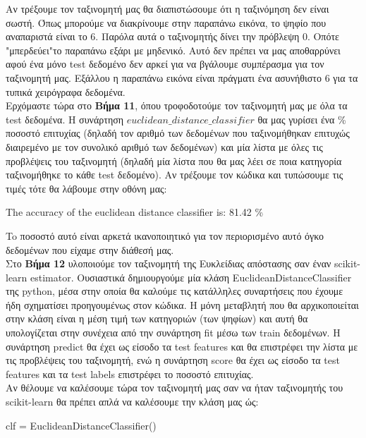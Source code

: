 \documentclass[11pt]{article} %
\begin{document}
Αν τρέξουμε τον ταξινομητή μας θα διαπιστώσουμε ότι η ταξινόμηση δεν είναι σωστή. Όπως μπορούμε να διακρίνουμε στην παραπάνω εικόνα, το ψηφίο που αναπαριστά είναι το $6$. Παρόλα αυτά ο ταξινομητής δίνει την πρόβλεψη $0$. Οπότε "μπερδεύει"το παραπάνω εξάρι με μηδενικό. Αυτό δεν πρέπει να μας αποθαρρύνει αφού ένα μόνο test δεδομένο δεν αρκεί για να βγάλουμε συμπέρασμα για τον ταξινομητή μας. Εξάλλου η παραπάνω εικόνα είναι πράγματι ένα ασυνήθιστο $6$ για τα τυπικά χειρόγραφα δεδομένα.\\

Ερχόμαστε τώρα στο \textbf{Βήμα 11}, όπου τροφοδοτούμε τον ταξινομητή μας με όλα τα test δεδομένα. Η συνάρτηση $euclidean\_distance\_classifier$ θα μας γυρίσει ένα \% ποσοστό επιτυχίας (δηλαδή τον αριθμό των δεδομένων που ταξινομήθηκαν επιτυχώς διαιρεμένο με τον συνολικό αριθμό των δεδομένων) και μία λίστα με όλες τις προβλέψεις του ταξινομητή (δηλαδή μία λίστα που θα μας λέει σε ποια κατηγορία ταξινομήθηκε το κάθε test δεδομένο). Αν τρέξουμε τον κώδικα και τυπώσουμε τις τιμές τότε θα λάβουμε στην οθόνη μας:

\begin{center}
The accuracy of the euclidean distance classifier is: 81.42 \%
\end{center}

To ποσοστό αυτό είναι αρκετά ικανοποιητικό για τον περιορισμένο αυτό όγκο δεδομένων που είχαμε στην διάθεσή μας.\\


Στο \textbf{Βήμα 12} υλοποιούμε τον ταξινομητή της Ευκλείδιας απόστασης σαν έναν scikit-learn estimator. Ουσιαστικά δημιουργούμε μία κλάση EuclideanDistanceClassifier της python, μέσα στην οποία θα καλούμε τις κατάλληλες συναρτήσεις που έχουμε ήδη σχηματίσει προηγουμένως στον κώδικα. Η μόνη μεταβλητή που θα αρχικοποιείται στην κλάση είναι η μέση τιμή των κατηγοριών (των ψηφίων) και αυτή θα υπολογίζεται στην συνέχεια από την συνάρτηση fit μέσω των train δεδομένων. Η συνάρτηση predict θα έχει ως είσοδο τα test features και θα επιστρέφει την λίστα με τις προβλέψεις του ταξινομητή, ενώ η συνάρτηση score θα έχει ως είσοδο τα test features και τα test labels επιστρέφει το ποσοστό επιτυχίας.\\

Αν θέλουμε να καλέσουμε τώρα τον ταξινομητή μας σαν να ήταν ταξινομητής του scikit-learn θα πρέπει απλά να καλέσουμε την κλάση μας ώς:
\begin{center}
clf  = EuclideanDistanceClassifier()
\end{center}
\end{document}
